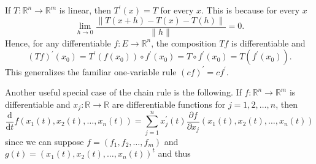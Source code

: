If \(T: \mathbb{R} ^n \to \mathbb{R} ^m\) is linear, then \(T^{\prime} (x) = T\) for every \(x\). This is because for every \(x\) 
\[
  \lim_{h \to 0} \frac{\lVert T(x + h) - T(x) - T(h) \rVert }{\lVert h \rVert } = 0.   
\]
Hence, for any differentiable \(f: E \to \mathbb{R} ^n\), the composition \(Tf\) is differentiable and 
\[
    (Tf)^{\prime} (x_0) = T^{\prime} (f(x_0)) \circ f^{\prime} (x_0) = T \circ f^{\prime} (x_0) = T(f^{\prime} (x_0)).
\]     
This generalizes the familiar one-variable rule \((cf)^{\prime} = cf^{\prime} \). 

Another useful special case of the chain rule is the following. If \(f: \mathbb{R} ^n \to \mathbb{R} ^m\) is differentiable and \(x_j : \mathbb{R} \to \mathbb{R} \) are differentiable functions for \(j = 1,2,\dots ,n\), then 
\[
    \frac{\mathrm{d}}{\mathrm{d}t} f(x_1(t), x_2(t), \dots , x_n(t)) = \sum_{j=1}^n x_j^{\prime} (t) \frac{\partial f}{\partial x_j} (x_1(t), x_2(t), \dots , x_n(t))   
\]   
since we can suppose \(f = (f_1, f_2, \dots , f_m)\) and \(g(t) = (x_1(t), x_2(t), \dots , x_n(t))^t\) and thus 
